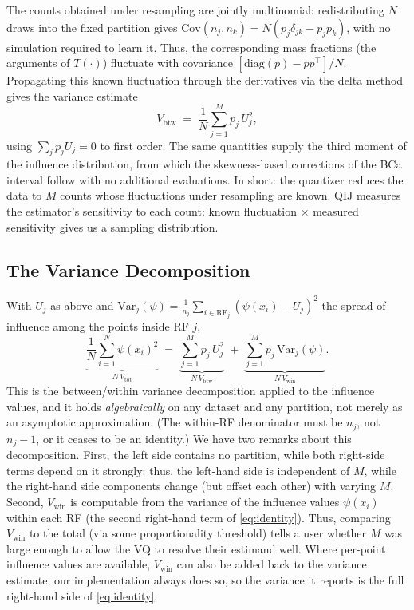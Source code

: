 \documentclass[runningheads]{llncs}
\newcommand{\ifl}{\psi}
\newcommand{\Vcell}{V_{\mathrm{btw}}}
\newcommand{\Vwithin}{V_{\mathrm{win}}}
\newcommand{\Vtotal}{V_{\mathrm{tot}}}
\begin{document}
The counts obtained under resampling are jointly multinomial: redistributing $N$ draws into the fixed partition gives $\mathrm{Cov}(n_j, n_k) = N(p_j \delta_{jk} - p_j p_k)$, with no simulation required to learn it. Thus, the corresponding mass fractions (the arguments of $T(\cdot)$) fluctuate with covariance $[\mathrm{diag}(p) - pp^{\top}]/N$. Propagating this known fluctuation through the derivatives via the delta method gives the variance estimate
\begin{equation}\label{eq:Vcell}
\Vcell \;=\; \frac1N \sum_{j=1}^{M} p_j\, U_j^{2},
\end{equation}
using $\sum_j p_j U_j = 0$ to first order. The same quantities supply the third moment of the influence distribution, from which the skewness-based corrections of the BCa interval \cite{efron1987} follow with no additional evaluations. In short: the quantizer reduces the data to $M$ counts whose fluctuations under resampling are known. QIJ measures the estimator's sensitivity to each count: known fluctuation $\times$ measured sensitivity gives us a sampling distribution.

\subsection{The Variance Decomposition}\label{sec:identity}

With $U_j$ as above and $\mathrm{Var}_j(\ifl) = \tfrac{1}{n_j}\sum_{i \in \mathrm{RF}_j}(\ifl(x_i) - U_j)^2$ the spread of influence among the points inside RF $j$,
\begin{equation}\label{eq:identity}
\underbrace{\frac1N\sum_{i=1}^{N} \ifl(x_i)^{2}}_{N\,\Vtotal}
\;=\;
\underbrace{\sum_{j=1}^{M} p_j\, U_j^{2}}_{N\,\Vcell}
\;+\;
\underbrace{\sum_{j=1}^{M} p_j\, \mathrm{Var}_j(\ifl)}_{N\,\Vwithin}.
\end{equation}
This is the between/within variance decomposition applied to the influence values, and it holds \emph{algebraically} on any dataset and any partition, not merely as an asymptotic approximation. (The within-RF denominator must be $n_j$, not $n_j{-}1$, or it ceases to be an identity.) We have two remarks about this decomposition. First, the left side contains no partition, while both right-side terms depend on it strongly: thus, the left-hand side is independent of $M$, while the right-hand side components change (but offset each other) with varying $M$. Second, $\Vwithin$ is computable from the variance of the influence values $\ifl(x_i)$ within each RF (the second right-hand term of \eqref{eq:identity}). Thus, comparing $\Vwithin$ to the total (via some proportionality threshold) tells a user whether $M$ was large enough to allow the VQ to resolve their estimand well. Where per-point influence values are available, $\Vwithin$ can also be added back to the variance estimate; our implementation always does so, so the variance it reports is the full right-hand side of \eqref{eq:identity}.
\end{document}
